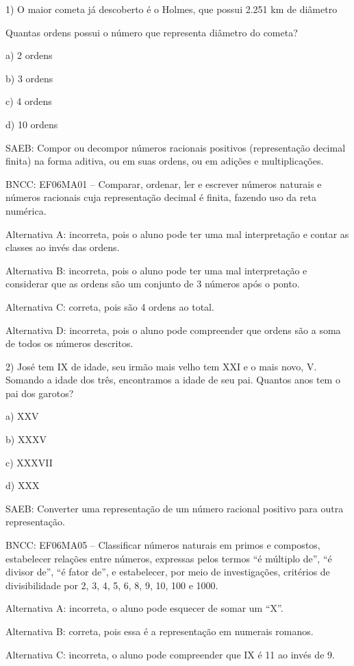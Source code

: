 
1) O maior cometa já descoberto é o Holmes, que possui 2.251 km de
diâmetro

Quantas ordens possui o número que representa diâmetro do cometa?

a) 2 ordens

b) 3 ordens

c) 4 ordens

d) 10 ordens

SAEB: Compor ou decompor números racionais positivos (representação
decimal finita) na forma aditiva, ou em suas ordens, ou em adições e
multiplicações.

BNCC: EF06MA01 -- Comparar, ordenar, ler e escrever números naturais e
números racionais cuja representação decimal é finita, fazendo uso da
reta numérica.

Alternativa A: incorreta, pois o aluno pode ter uma mal interpretação e
contar as classes ao invés das ordens.

Alternativa B: incorreta, pois o aluno pode ter uma mal interpretação e
considerar que as ordens são um conjunto de 3 números após o ponto.

Alternativa C: correta, pois são 4 ordens ao total.

Alternativa D: incorreta, pois o aluno pode compreender que ordens são a
soma de todos os números descritos.

2) José tem IX de idade, seu irmão mais velho tem XXI e o mais novo, V.
Somando a idade dos três, encontramos a idade de seu pai. Quantos anos
tem o pai dos garotos?

a) XXV

b) XXXV

c) XXXVII

d) XXX

SAEB: Converter uma representação de um número racional positivo para
outra representação.

BNCC: EF06MA05 -- Classificar números naturais em primos e compostos,
estabelecer relações entre números, expressas pelos termos ``é múltiplo
de'', ``é divisor de'', ``é fator de'', e estabelecer, por meio de
investigações, critérios de divisibilidade por 2, 3, 4, 5, 6, 8, 9, 10,
100 e 1000.

Alternativa A: incorreta, o aluno pode esquecer de somar um ``X''.

Alternativa B: correta, pois essa é a representação em numerais romanos.

Alternativa C: incorreta, o aluno pode compreender que IX é 11 ao invés
de 9.


